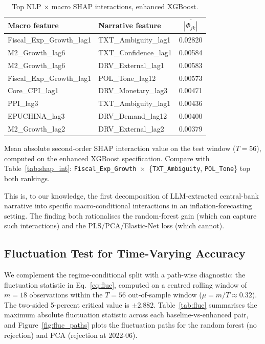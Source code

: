 \documentclass[AER]{AEA}
\begin{document}
\begin{table}[tbp]
\caption{Top NLP $\times$ macro SHAP interactions, enhanced XGBoost.\label{tab:shap_xgb}}
\centering
\begin{tabular}{llc}
\toprule
Macro feature & Narrative feature & $\overline{|\Phi_{jk}|}$ \\
\midrule
Fiscal\_Exp\_Growth\_lag1 & TXT\_Ambiguity\_lag1 & 0.02820 \\
M2\_Growth\_lag6          & TXT\_Confidence\_lag1 & 0.00584 \\
M2\_Growth\_lag6          & DRV\_External\_lag1   & 0.00583 \\
Fiscal\_Exp\_Growth\_lag1 & POL\_Tone\_lag12      & 0.00573 \\
Core\_CPI\_lag1           & DRV\_Monetary\_lag3   & 0.00471 \\
PPI\_lag3                 & TXT\_Ambiguity\_lag1  & 0.00436 \\
EPUCHINA\_lag3            & DRV\_Demand\_lag12    & 0.00400 \\
M2\_Growth\_lag2          & DRV\_External\_lag2   & 0.00379 \\
\bottomrule
\end{tabular}
\begin{tablenotes}
Mean absolute second-order SHAP interaction value on the test window
($T=56$), computed on the enhanced XGBoost specification. Compare with
Table~\ref{tab:shap_int}: \texttt{Fiscal\_Exp\_Growth}~$\times$~\{\texttt{TXT\_Ambiguity},
\texttt{POL\_Tone}\} top both rankings.
\end{tablenotes}
\end{table}

This is, to our knowledge, the first decomposition of LLM-extracted
central-bank narrative into specific macro-conditional interactions in an
inflation-forecasting setting. The finding both rationalises the
random-forest gain (which can capture such interactions) and the
PLS/PCA/Elastic-Net loss (which cannot).

\subsection{Fluctuation Test for Time-Varying Accuracy}\label{ssec:fluc}

We complement the regime-conditional split with a path-wise diagnostic:
the \citet{giacomini2010forecast} fluctuation statistic in
Eq.~\eqref{eq:fluc}, computed on a centred rolling window of $m=18$
observations within the $T=56$ out-of-sample window ($\mu = m/T \approx
0.32$). The two-sided 5-percent critical value is $\pm 2.882$.
Table~\ref{tab:fluc} summarises the maximum absolute fluctuation statistic
across each baseline-vs-enhanced pair, and Figure~\ref{fig:fluc_paths}
plots the fluctuation paths for the random forest (no rejection) and PCA
(rejection at 2022-06).
\end{document}
